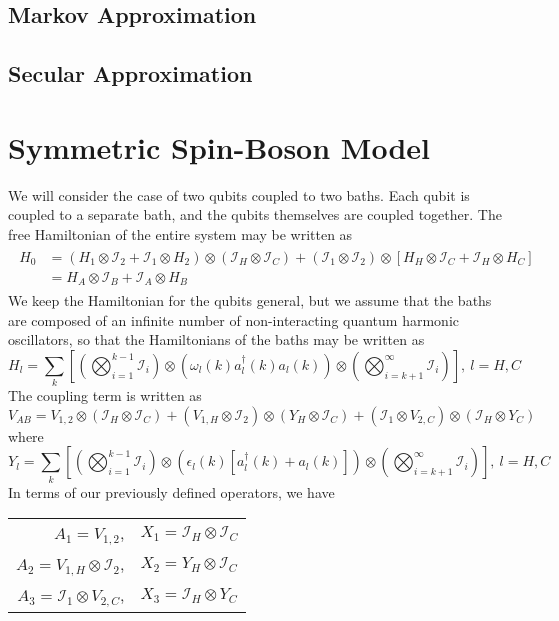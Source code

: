 \documentclass[aps, prl, preprint]{revtex4-1}
\newcommand{\ten}{\otimes}
\newcommand{\I}{\mathcal{I}}
\begin{document}
\subsection{Markov Approximation}






\subsection{Secular Approximation}





\section{Symmetric Spin-Boson Model}

We will consider the case of two qubits coupled to two baths. Each qubit is coupled to a separate bath, and the qubits themselves are coupled together. The free Hamiltonian of the entire system may be written as
\begin{align}\label{freeham}
\begin{split}
H_0 &= (H_1\ten \I_2 + \I_1\ten H_2)\ten(\I_H\ten \I_C) + (\I_1\ten \I_2)\ten\left[H_H\ten \I_C + \I_H\ten H_C\right]\\
&= H_A\ten \I_B + \I_A\ten H_B
\end{split}
\end{align}
We keep the Hamiltonian for the qubits general, but we assume that the baths are composed of an infinite number of non-interacting quantum harmonic oscillators, so that the Hamiltonians of the baths may be written as
\begin{equation}\label{bathham}
H_l = \sum_k\left[\left(\bigotimes_{i=1}^{k-1}\I_i\right)\ten\left(\omega_l(k) a_l^{\dag}(k)a_l(k)\right)\ten\left(\bigotimes_{i=k+1}^{\infty}\I_i\right)\right],\ l = H,C
\end{equation}
The coupling term is written as
\begin{equation}\label{modcoup}
V_{AB} = V_{1,2}\ten\left(\I_H\ten \I_C\right) + \left(V_{1,H}\ten \I_2\right)\ten\left(Y_H\ten \I_C\right) + \left(\I_1\ten V_{2,C}\right)\ten\left(\I_H\ten Y_C\right)
\end{equation}
where
\begin{equation}\label{yl}
Y_l = \sum_k\left[\left(\bigotimes_{i=1}^{k-1}\I_i\right)\ten\left(\epsilon_l(k)\left[a_l^{\dag}(k) + a_l(k)\right]\right)\ten\left(\bigotimes_{i=k+1}^{\infty}\I_i\right)\right],\ l = H,C
\end{equation}
In terms of our previously defined operators, we have
\begin{center}
\begin{tabular}{rl}
	$A_1 = V_{1,2}$, & $X_1 = \I_H\ten\I_C$ \\ 
	$A_2 = V_{1,H}\ten\I_2$, & $X_2 = Y_H\ten\I_C$ \\ 
	$A_3 = \I_1\ten V_{2,C}$, & $X_3 = \I_H\ten Y_C$ \\ 
\end{tabular} 
\end{center}
\end{document}

